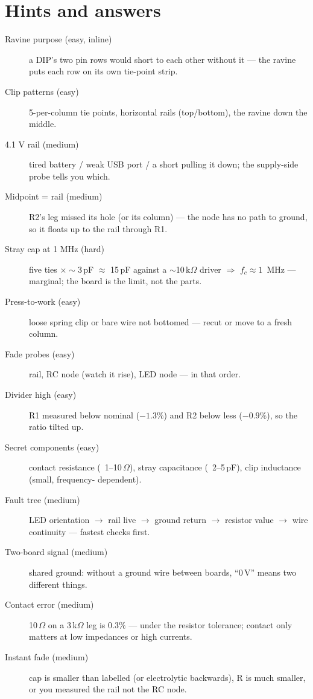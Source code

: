 \section*{Hints and answers}
\begin{description}
\item[Ravine purpose (easy, inline)] a DIP's two pin rows would
short to each other without it --- the ravine puts each row on its
own tie-point strip.
\item[Clip patterns (easy)] 5-per-column tie points, horizontal
rails (top/bottom), the ravine down the middle.
\item[4.1 V rail (medium)] tired battery / weak USB port / a
short pulling it down; the supply-side probe tells you which.
\item[Midpoint = rail (medium)] R2's leg missed its hole (or its
column) --- the node has no path to ground, so it floats up to the
rail through R1.
\item[Stray cap at 1 MHz (hard)] five ties $\times\sim$3\,pF
$\approx$ 15\,pF against a $\sim$10\,k$\Omega$ driver
$\Rightarrow$ $f_c \approx 1$~MHz --- marginal; the board is the
limit, not the parts.
\item[Press-to-work (easy)] loose spring clip or bare wire not
bottomed --- recut or move to a fresh column.
\item[Fade probes (easy)] rail, RC node (watch it rise), LED node
--- in that order.
\item[Divider high (easy)] R1 measured below nominal ($-1.3\%$) and
R2 below less ($-0.9\%$), so the ratio tilted up.
\item[Secret components (easy)] contact resistance (~1--10\,$\Omega$),
stray capacitance (~2--5\,pF), clip inductance (small, frequency-
dependent).
\item[Fault tree (medium)] LED orientation $\to$ rail live $\to$
ground return $\to$ resistor value $\to$ wire continuity --- fastest
checks first.
\item[Two-board signal (medium)] shared ground: without a ground
wire between boards, ``0\,V'' means two different things.
\item[Contact error (medium)] 10\,$\Omega$ on a 3\,k$\Omega$ leg is
$0.3\%$ --- under the resistor tolerance; contact only matters at
low impedances or high currents.
\item[Instant fade (medium)] cap is smaller than labelled (or
electrolytic backwards), R is much smaller, or you measured the
rail not the RC node.

\end{description}
